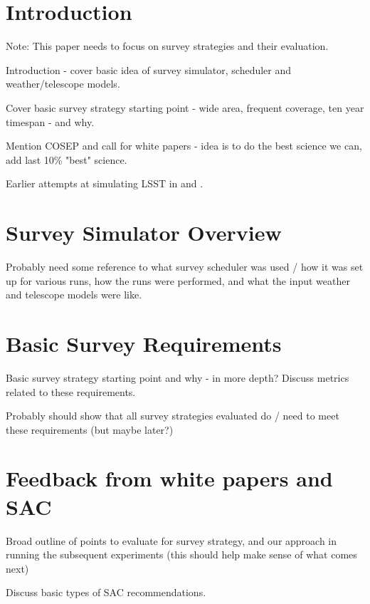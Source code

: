 
\section{Introduction}

Note: This paper needs to focus on survey strategies and their evaluation. 

Introduction - cover basic idea of survey simulator, scheduler and weather/telescope models. 

Cover basic survey strategy starting point - wide area, frequent coverage, ten year timespan - and why. 

Mention COSEP and call for white papers - idea is to do the best science we can, add last 10\% "best" science. 

Earlier attempts at simulating LSST in \citet{Rothchild19} and \citet{Naghib19}.

\section{Survey Simulator Overview}
Probably need some reference to what survey scheduler was used / how it was set up for various runs, how the runs were performed, and what the input weather and telescope models were like. 

\section{Basic Survey Requirements}
Basic survey strategy starting point and why - in more depth? Discuss metrics related to these requirements. 

Probably should show that all survey strategies evaluated do / need to meet these requirements (but maybe later?)

\section{Feedback from white papers and SAC} 
Broad outline of points to evaluate for survey strategy, and our approach in running the subsequent experiments (this should help make sense of what comes next)

Discuss basic types of SAC recommendations. 




